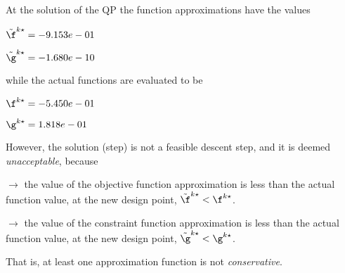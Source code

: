 At the solution of the QP the function approximations have the values

$\tilde \f^{k\star} = -9.153e-01$

$\tilde \g^{k\star} = -1.680e-10$

\bigskip
while the actual functions are evaluated to be

$\f^{k\star} = -5.450e-01$

$\g^{k\star} =  1.818e-01$

\bigskip
 However, the solution (step)                         is not a feasible descent step, and it is deemed                         \emph{unacceptable}, because 
 
$\to$ the value of the objective                             function approximation is less than the actual function                             value, at the new design point,                             $\tilde {\f}^{k\star} < {\f}^{k\star}$.

 $\to$ the value of the constraint function                             approximation is less than the actual function value, at                             the new design point, $\tilde {\g}^{k\star} < {\g}^{k\star}$.

 \bigskip 

 That is, at least one approximation                         function is not \emph{conservative}.
